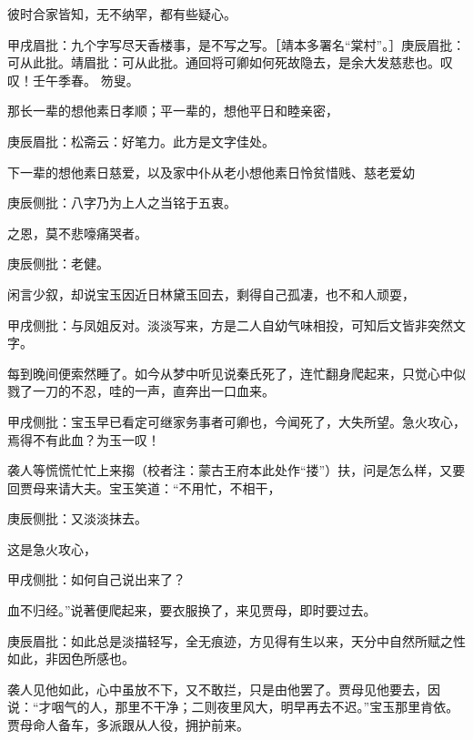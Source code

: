 \begin{parag}
    彼时合家皆知，无不纳罕，都有些疑心。\begin{note}甲戌眉批：九个字写尽天香楼事，是不写之写。［靖本多署名“棠村”。］庚辰眉批：可从此批。靖眉批：可从此批。通回将可卿如何死故隐去，是余大发慈悲也。叹叹！壬午季春。 笏叟。\end{note}那长一辈的想他素日孝顺；平一辈的，想他平日和睦亲密，\begin{note}庚辰眉批：松斋云：好笔力。此方是文字佳处。\end{note}下一辈的想他素日慈爱，以及家中仆从老小想他素日怜贫惜贱、慈老爱幼\begin{note}庚辰侧批：八字乃为上人之当铭于五衷。\end{note}之恩，莫不悲嚎痛哭者。\begin{note}庚辰侧批：老健。\end{note}
\end{parag}


\begin{parag}
    闲言少叙，却说宝玉因近日林黛玉回去，剩得自己孤凄，也不和人顽耍，\begin{note}甲戌侧批：与凤姐反对。淡淡写来，方是二人自幼气味相投，可知后文皆非突然文字。\end{note}每到晚间便索然睡了。如今从梦中听见说秦氏死了，连忙翻身爬起来，只觉心中似戮了一刀的不忍，哇的一声，直奔出一口血来。\begin{note}甲戌侧批：宝玉早已看定可继家务事者可卿也，今闻死了，大失所望。急火攻心，焉得不有此血？为玉一叹！\end{note}袭人等慌慌忙忙上来搊（校者注：蒙古王府本此处作“搂”）扶，问是怎么样，又要回贾母来请大夫。宝玉笑道：“不用忙，不相干，\begin{note}庚辰侧批：又淡淡抹去。\end{note}这是急火攻心，\begin{note}甲戌侧批：如何自己说出来了？\end{note}血不归经。”说著便爬起来，要衣服换了，来见贾母，即时要过去。\begin{note}庚辰眉批：如此总是淡描轻写，全无痕迹，方见得有生以来，天分中自然所赋之性如此，非因色所感也。\end{note}袭人见他如此，心中虽放不下，又不敢拦，只是由他罢了。贾母见他要去，因说：“才咽气的人，那里不干净；二则夜里风大，明早再去不迟。”宝玉那里肯依。贾母命人备车，多派跟从人役，拥护前来。
\end{parag}



